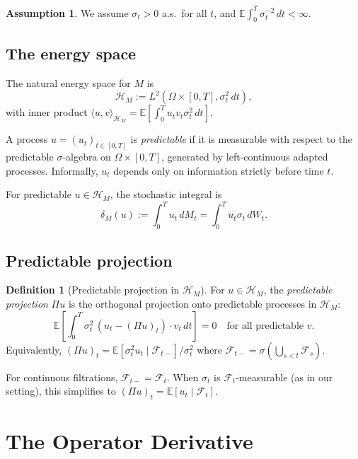 \documentclass[11pt]{article}
\theoremstyle{plain}
\theoremstyle{definition}
\newtheorem{definition}{Definition}[section]
\newtheorem{assumption}{Assumption}[section]
\theoremstyle{remark}
\newcommand{\E}{\mathbb{E}}
\newcommand{\F}{\mathcal{F}}
\newcommand{\HH}{\mathcal{H}}
\newcommand{\ip}[2]{\langle #1, #2 \rangle}
\begin{document}
\begin{assumption}\label{ass:nondegen}
We assume $\sigma_t > 0$ a.s.\ for all $t$, and $\E\int_0^T \sigma_t^{-2}\,dt < \infty$.
\end{assumption}

\subsection{The energy space}

The natural energy space for $M$ is
\begin{equation}\label{eq:energy-space}
\HH_M := L^2(\Omega \times [0,T], \sigma_t^2\,dt),
\end{equation}
with inner product $\ip{u}{v}_{\HH_M} = \E[\int_0^T u_t v_t \sigma_t^2\,dt]$.

A process $u = (u_t)_{t \in [0,T]}$ is \emph{predictable} if it is measurable 
with respect to the predictable $\sigma$-algebra on $\Omega \times [0,T]$, 
generated by left-continuous adapted processes. Informally, $u_t$ depends only 
on information strictly before time $t$.

For predictable $u \in \HH_M$, the stochastic integral is
\begin{equation}\label{eq:delta-M}
\delta_M(u) := \int_0^T u_t\,dM_t = \int_0^T u_t \sigma_t\,dW_t.
\end{equation}

\subsection{Predictable projection}

\begin{definition}[Predictable projection in $\HH_M$]\label{def:pred-proj}
For $u \in \HH_M$, the \emph{predictable projection} $\Pi u$ is the orthogonal 
projection onto predictable processes in $\HH_M$:
\[
\E\left[\int_0^T \sigma_t^2\,(u_t - (\Pi u)_t) \cdot v_t\,dt\right] = 0 
\quad \text{for all predictable } v.
\]
Equivalently, $(\Pi u)_t = \E[\sigma_t^2 u_t \mid \F_{t-}]/\sigma_t^2$ where 
$\F_{t-} = \sigma(\bigcup_{s<t} \F_s)$.
\end{definition}

For continuous filtrations, $\F_{t-} = \F_t$. When $\sigma_t$ is $\F_t$-measurable 
(as in our setting), this simplifies to $(\Pi u)_t = \E[u_t \mid \F_t]$.

\section{The Operator Derivative}\label{sec:first-order}
\end{document}

